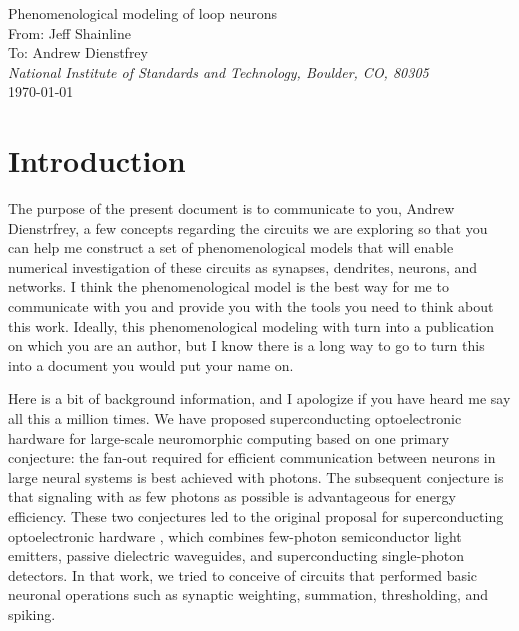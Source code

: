 \documentclass[]{article}
\begin{document}
    
\begin{center}
\LARGE{Phenomenological modeling of loop neurons}\\ 
\vspace{0.3em}
\large From: Jeff Shainline \\
\large To: Andrew Dienstfrey\\
\vspace{0.0em}
\textit{\small National Institute of Standards and Technology, Boulder, CO, 80305}\\
\vspace{0.3em}
\small \today

\begin{abstract}

\vspace{1em}
\end{abstract}

\end{center}


\setcounter{tocdepth}{1}
\setcounter{secnumdepth}{4}
\tableofcontents

\section{\label{sec:introduction}Introduction}
The purpose of the present document is to communicate to you, Andrew Dienstrfrey, a few concepts regarding the circuits we are exploring so that you can help me construct a set of phenomenological models that will enable numerical investigation of these circuits as synapses, dendrites, neurons, and networks. I think the phenomenological model is the best way for me to communicate with you and provide you with the tools you need to think about this work. Ideally, this phenomenological modeling with turn into a publication on which you are an author, but I know there is a long way to go to turn this into a document you would put your name on.

Here is a bit of background information, and I apologize if you have heard me say all this a million times. We have proposed superconducting optoelectronic hardware for large-scale neuromorphic computing based on one primary conjecture: the fan-out required for efficient communication between neurons in large neural systems is best achieved with photons. The subsequent conjecture is that signaling with as few photons as possible is advantageous for energy efficiency. These two conjectures led to the original proposal for superconducting optoelectronic hardware \cite{shbu2017}, which combines few-photon semiconductor light emitters, passive dielectric waveguides, and superconducting single-photon detectors. In that work, we tried to conceive of circuits that performed basic neuronal operations such as synaptic weighting, summation, thresholding, and spiking. 
\end{document}
